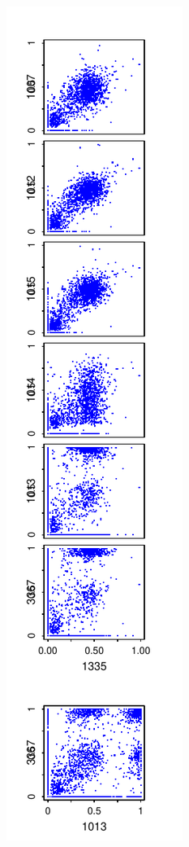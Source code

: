 \documentclass{article}\usepackage[]{graphicx}\usepackage[]{color}
\begin{document}
\includegraphics{Fig1-mscat-figs/6+1julie2F.pdf}
\end{document}

